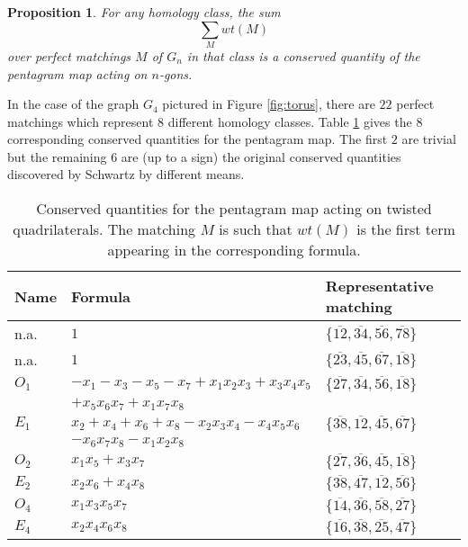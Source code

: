 \documentclass{amsart}
\newtheorem{proposition}[theorem]{Proposition}
\theoremstyle{definition}
\theoremstyle{remark}
\numberwithin{equation}{section}
\begin{document}
	\begin{proposition}
		For any homology class, the sum
		\begin{displaymath}
			\sum_M wt(M)
		\end{displaymath}
		over perfect matchings $M$ of $G_n$ in that class is a conserved quantity of the pentagram map acting on $n$-gons.	\end{proposition}
	
	In the case of the graph $G_4$ pictured in Figure \ref{fig:torus}, there are $22$ perfect matchings which represent $8$ different homology classes.  Table \ref{table:integrals} gives the $8$ corresponding conserved quantities for the pentagram map.  The first $2$ are trivial but the remaining $6$ are (up to a sign) the original conserved quantities discovered by Schwartz \cite{S08} by different means.
	
	\begin{table}[ht]
	\begin{tabular}{l|l|l}
	Name & Formula & Representative matching\\
	\hline
	n.a.  & $1$ & $\{\overline{12}, \overline{34}, \overline{56}, \overline{78}\}$\\
	n.a.  & $1$ & $\{\overline{23}, \overline{45}, \overline{67}, \overline{18}\}$\\
	$O_1$ & $-x_1-x_3-x_5-x_7+x_1x_2x_3+x_3x_4x_5$ & $\{\overline{27}, \overline{34}, \overline{56}, \overline{18}\}$ \\
	& $+x_5x_6x_7+x_1x_7x_8$ \\
	$E_1$ & $x_2+x_4+x_6+x_8-x_2x_3x_4-x_4x_5x_6$ & $\{\overline{38}, \overline{12}, \overline{45}, \overline{67}\}$ \\
	& $-x_6x_7x_8-x_1x_2x_8$ \\
	$O_2$ & $x_1x_5 + x_3x_7$ & $\{\overline{27}, \overline{36}, \overline{45}, \overline{18}\}$ \\
	$E_2$ & $x_2x_6 + x_4x_8$ & $\{\overline{38}, \overline{47}, \overline{12}, \overline{56}\}$ \\
	$O_4$ & $x_1x_3x_5x_7$ & $\{\overline{14}, \overline{36}, \overline{58}, \overline{27}\}$ \\
	$E_4$ & $x_2x_4x_6x_8$ & $\{\overline{16}, \overline{38}, \overline{25}, \overline{47}\}$ \\
	\end{tabular}
	\caption{Conserved quantities for the pentagram map acting on twisted quadrilaterals.  The matching $M$ is such that $wt(M)$ is the first term appearing in the corresponding formula.}
	\label{table:integrals}
	\end{table}
	
\end{document}
